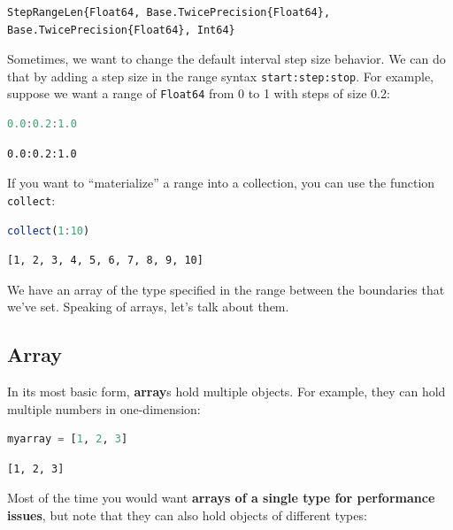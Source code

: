 \documentclass[
  notoc %
]{tufte-book}
\newcommand{\passthrough}[1]{#1}
\begin{document}
\begin{lstlisting}[language=Output]
StepRangeLen{Float64, Base.TwicePrecision{Float64}, Base.TwicePrecision{Float64}, Int64}
\end{lstlisting}

Sometimes, we want to change the default interval step size behavior. We
can do that by adding a step size in the range syntax
\passthrough{\lstinline!start:step:stop!}. For example, suppose we want
a range of \passthrough{\lstinline!Float64!} from 0 to 1 with steps of
size 0.2:

\begin{lstlisting}[language=Julia]
0.0:0.2:1.0
\end{lstlisting}

\begin{lstlisting}[language=Output]
0.0:0.2:1.0
\end{lstlisting}

If you want to ``materialize'' a range into a collection, you can use
the function \passthrough{\lstinline!collect!}:

\begin{lstlisting}[language=Julia]
collect(1:10)
\end{lstlisting}

\begin{lstlisting}[language=Output]
[1, 2, 3, 4, 5, 6, 7, 8, 9, 10]
\end{lstlisting}

We have an array of the type specified in the range between the
boundaries that we've set. Speaking of arrays, let's talk about them.

\hypertarget{sec:array}{%
\subsection{Array}\label{sec:array}}

In its most basic form, \textbf{array}s hold multiple objects. For
example, they can hold multiple numbers in one-dimension:

\begin{lstlisting}[language=Julia]
myarray = [1, 2, 3]
\end{lstlisting}

\begin{lstlisting}[language=Output]
[1, 2, 3]
\end{lstlisting}

Most of the time you would want \textbf{arrays of a single type for
performance issues}, but note that they can also hold objects of
different types:
\end{document}
